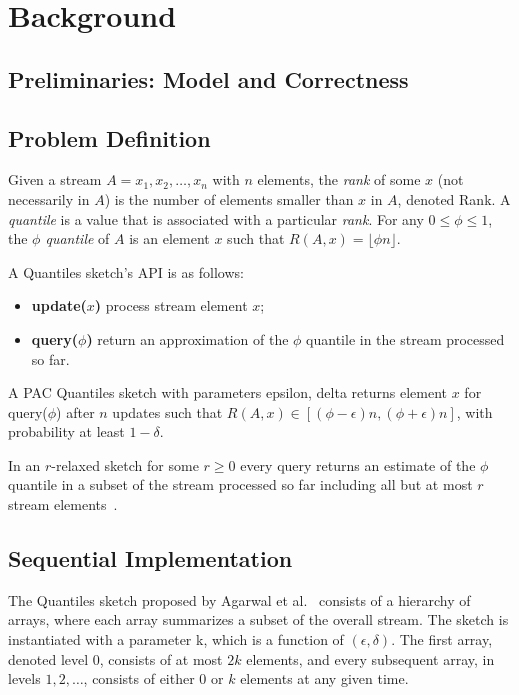 \chapter{Background}
\label{chap:background}

\section{Preliminaries: Model and Correctness}
\label{sec:prelims}


\section{Problem Definition} \label{sec:problem_define}

Given a stream $A=x_1,x_2,\dots,x_n$ with $n$ elements,
the \emph{rank} of some $x$ (not necessarily in $A$) is the number of elements smaller than $x$ in $A$, denoted \gls{Rank}. A \emph{quantile} is a value that is associated with a particular \emph{rank}. For any $0 \leq \phi \leq 1$, the \emph{$\phi$ quantile} of $A$ is an element $x$ such that $R(A,x)=\lfloor \phi n \rfloor$.
                                                                             
A Quantiles sketch's \gls{API} is as follows:
\begin{itemize}
\item \textbf{update(}$x$\textbf{)} process stream element $x$;
\item \textbf{query(}$\phi$\textbf{)} return an approximation of the $\phi$ quantile in the stream processed so far. 
\end{itemize}
A PAC Quantiles sketch with parameters \gls{epsilon}, \gls{delta} returns element $x$ for query($\phi$) after $n$ updates such that $R(A,x) \in \left[ (\phi-\epsilon)n,(\phi+\epsilon)n  \right]$, with probability at least $1-\delta$.

In an $r$-relaxed sketch for some $r\geq0$ every query returns an estimate of the $\phi$ quantile in a subset of the stream processed so far including all but at most $r$ stream elements~\cite{Henzinger_2013_Quantitative_Relaxation, Rinberg_2020_fast_sketches}.


\section{Sequential Implementation} \label{sec:seq_imp}


The Quantiles sketch proposed by Agarwal et al.~\cite{mergeables_summaries} consists of a hierarchy of arrays, where each array summarizes a subset of the overall stream. The sketch is instantiated with a parameter \gls{k}, which is a function of $(\epsilon,\delta)$. The first array, denoted level $0$, consists of at most $2k$ elements, and every subsequent array, in levels $1,2,\dots$, consists of either $0$ or $k$ elements at any given time.

